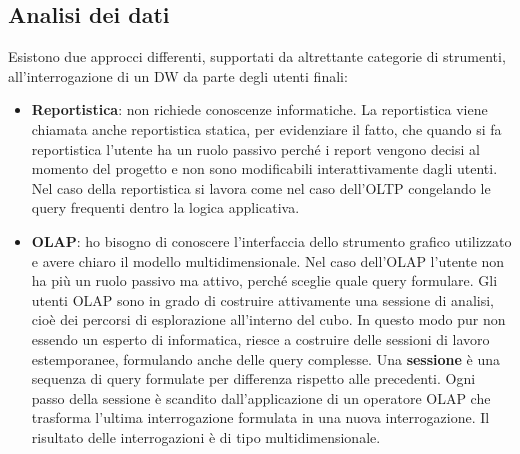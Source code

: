 \subsection{Analisi dei dati}
Esistono due approcci differenti, supportati da altrettante categorie di strumenti, all’interrogazione di un DW da parte degli utenti finali:
\begin{itemize}
	\item 
	\textbf{Reportistica}: non richiede conoscenze informatiche. La reportistica viene chiamata anche reportistica statica, per evidenziare il fatto, che quando si fa reportistica l’utente ha un ruolo passivo perché i report vengono decisi al momento del progetto e non sono modificabili interattivamente dagli utenti. Nel caso della reportistica si lavora come nel caso dell’OLTP congelando le query frequenti dentro la logica applicativa. 
	\item
	\textbf{OLAP}: ho bisogno di conoscere l’interfaccia dello strumento grafico utilizzato e avere chiaro il modello multidimensionale. Nel caso dell’OLAP l’utente non ha più un ruolo passivo ma attivo, perché sceglie quale query formulare. Gli utenti OLAP sono in grado di costruire attivamente una sessione di analisi, cioè dei percorsi di esplorazione all’interno del cubo. In questo modo pur non essendo un esperto di informatica, riesce a costruire delle sessioni di lavoro estemporanee, formulando anche delle query complesse. Una \textbf{sessione} è una sequenza di query formulate per differenza rispetto alle precedenti. Ogni passo della sessione è scandito dall’applicazione di un operatore OLAP che trasforma l’ultima interrogazione formulata in una nuova interrogazione. Il risultato delle interrogazioni è di tipo multidimensionale. 
\end{itemize}
